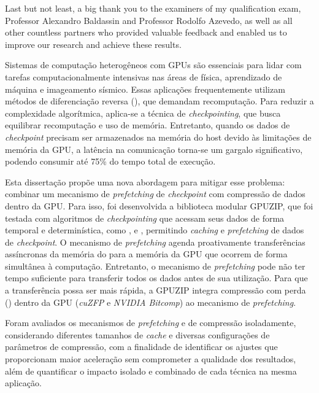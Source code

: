 \documentclass[Ingles]{ic-tese-v3}
\begin{document}
Last but not least, a big thank you to the examiners of my qualification exam, Professor Alexandro Baldassin and Professor Rodolfo Azevedo, as well as all other countless partners who provided valuable feedback and enabled us to improve our research and achieve these results.


\begin{resumo}
Sistemas de computação heterogêneos com GPUs são essenciais para lidar com tarefas computacionalmente intensivas nas áreas de física, aprendizado de máquina e imageamento sísmico. Essas aplicações frequentemente utilizam métodos de diferenciação reversa (), que demandam recomputação. Para reduzir a complexidade algorítmica, aplica-se a técnica de \textit{checkpointing}, que busca equilibrar recomputação e uso de memória. Entretanto, quando os dados de \textit{checkpoint} precisam ser armazenados na memória do host devido às limitações de memória da GPU, a latência na comunicação torna-se um gargalo significativo, podendo consumir até 75\% do tempo total de execução.

Esta dissertação propõe uma nova abordagem para mitigar esse problema: combinar um mecanismo de \textit{prefetching} de \textit{checkpoint} com compressão de dados dentro da GPU. Para isso, foi desenvolvida a biblioteca modular GPUZIP, que foi testada com algoritmos de \textit{checkpointing} que acessam seus dados de forma temporal e determinística, como \revolve, \zcut e \uniform, permitindo \textit{caching} e \textit{prefetching} de dados de \textit{checkpoint}. O mecanismo de \textit{prefetching} agenda proativamente transferências assíncronas da memória do  para a memória da GPU que ocorrem de forma simultânea à computação. Entretanto, o mecanismo de \textit{prefetching} pode não ter tempo suficiente para transferir todos os dados antes de sua utilização. Para que a transferência possa ser mais rápida, a GPUZIP integra compressão com perda () dentro da GPU (\textit{cuZFP} e \textit{NVIDIA Bitcomp}) ao mecanismo de \textit{prefetching}.

Foram avaliados os mecanismos de \textit{prefetching} e de compressão isoladamente, considerando diferentes tamanhos de \textit{cache} e diversas configurações de parâmetros de compressão, com a finalidade de identificar os ajustes que proporcionam maior aceleração sem comprometer a qualidade dos resultados, além de quantificar o impacto isolado e combinado de cada técnica na mesma aplicação.


\end{resumo}
\end{document}
